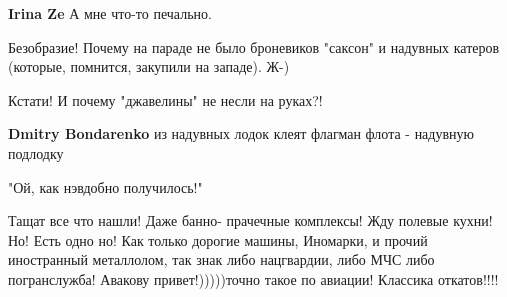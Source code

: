 \begin{itemize}
\begin{itemize}
 
\textbf{Irina Ze}
А мне что-то печально.

\end{itemize}

 
Безобразие!
Почему на параде не было броневиков "саксон" и надувных катеров (которые, помнится, закупили на западе). Ж-)

\begin{itemize}
 
Кстати! И почему "джавелины" не несли на руках?!

 
\textbf{Dmitry Bondarenko} из надувных лодок клеят флагман флота - надувную подлодку
\end{itemize}

 
"Ой, как нэвдобно получилось!" \Smiley[1.0][yellow]

 

Тащат все что нашли! Даже банно- прачечные комплексы! Жду полевые кухни! Но!
Есть одно но! Как только дорогие машины, Иномарки, и прочий иностранный
металлолом, так знак либо нацгвардии, либо МЧС либо погранслужба! Авакову
привет!)))))точно такое по авиации! Классика откатов!!!!



\end{itemize}
